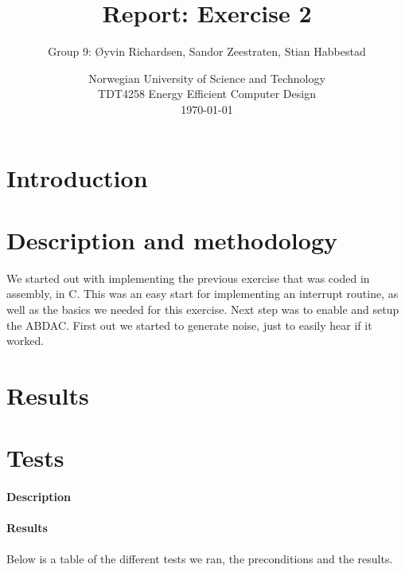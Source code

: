 \documentclass[a4paper,11pt]{article}
\title{\textbf{Report: Exercise 2}}
\author{Group 9: \O yvin Richardsen, Sandor Zeestraten, Stian Habbestad}
\date{{Norwegian University of Science and Technology \\
TDT4258 Energy Efficient Computer Design \\}
\today}
\begin{document}
\maketitle

\begin{abstract}

\end{abstract}

\tableofcontents
\newpage

\section{Introduction} 



\section{Description and methodology}
We started out with implementing the previous exercise that was coded in assembly, in C. This was an easy start for implementing an interrupt routine, as well as the basics we needed for this exercise. Next step was to enable and setup the ABDAC. First out we started to generate noise, just to easily hear if it worked. 

\section{Results}

\section{Tests}
\paragraph{Description}


\paragraph{Results}
Below is a table of the different tests we ran, the preconditions and the results.
\linebreak
\end{document}
